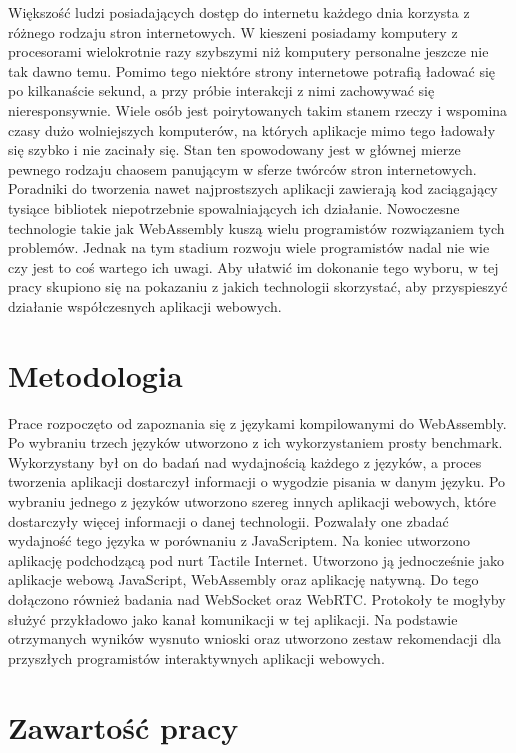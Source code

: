 \documentclass[language=polish,type=master]{aghmodern}
\begin{document}
Większość ludzi posiadających dostęp do internetu każdego dnia korzysta z różnego rodzaju stron internetowych.
W kieszeni posiadamy komputery z procesorami wielokrotnie razy szybszymi niż komputery personalne jeszcze nie tak dawno temu.
Pomimo tego niektóre strony internetowe potrafią ładować się po kilkanaście sekund, a przy próbie interakcji z nimi zachowywać się nieresponsywnie.
Wiele osób jest poirytowanych takim stanem rzeczy i wspomina czasy dużo wolniejszych komputerów, na których aplikacje mimo tego ładowały się szybko i nie zacinały się.
Stan ten spowodowany jest w głównej mierze pewnego rodzaju chaosem panującym w sferze twórców stron internetowych.
Poradniki do tworzenia nawet najprostszych aplikacji zawierają kod zaciągający tysiące bibliotek niepotrzebnie spowalniających ich działanie.
Nowoczesne technologie takie jak WebAssembly kuszą wielu programistów rozwiązaniem tych problemów.
Jednak na tym stadium rozwoju wiele programistów nadal nie wie czy jest to coś wartego ich uwagi.
Aby ułatwić im dokonanie tego wyboru, w tej pracy skupiono się na pokazaniu z jakich technologii skorzystać, aby przyspieszyć działanie współczesnych aplikacji webowych.

\section{Metodologia}

Prace rozpoczęto od zapoznania się z językami kompilowanymi do WebAssembly.
Po wybraniu trzech języków utworzono z ich wykorzystaniem prosty benchmark.
Wykorzystany był on do badań nad wydajnością każdego z języków, a proces tworzenia aplikacji dostarczył informacji o wygodzie pisania w danym języku.
Po wybraniu jednego z języków utworzono szereg innych aplikacji webowych, które dostarczyły więcej informacji o danej technologii.
Pozwalały one zbadać wydajność tego języka w porównaniu z JavaScriptem.
Na koniec utworzono aplikację podchodzącą pod nurt Tactile Internet.
Utworzono ją jednocześnie jako aplikacje webową JavaScript, WebAssembly oraz aplikację natywną.
Do tego dołączono również badania nad WebSocket oraz WebRTC.
Protokoły te mogłyby służyć przykładowo jako kanał komunikacji w tej aplikacji.
Na podstawie otrzymanych wyników wysnuto wnioski oraz utworzono zestaw rekomendacji dla przyszłych programistów interaktywnych aplikacji webowych.


\section{Zawartość pracy}
\end{document}
